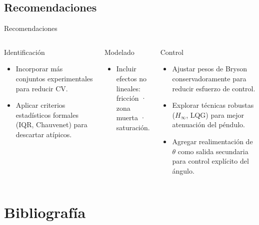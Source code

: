 \documentclass[mathserif,spanish,10pt]{beamer}
\begin{document}
\subsection{Recomendaciones}

\begin{frame}{Recomendaciones}
\begin{columns}[T]
  \begin{block}{Identificación}
    \begin{itemize}
      \item Incorporar más conjuntos experimentales para reducir CV.
      \item Aplicar criterios estadísticos formales (IQR, Chauvenet) para descartar atípicos.
    \end{itemize}
  \end{block}

  \begin{block}{Modelado}
    \begin{itemize}
      \item Incluir efectos no lineales:\\
            fricción · zona muerta · saturación.
    \end{itemize}
  \end{block}

  \begin{block}{Control}
    \begin{itemize}
      \item Ajustar pesos de Bryson conservadoramente para reducir esfuerzo de control.
      \item Explorar técnicas robustas ($H_\infty$, LQG) para mejor atenuación del péndulo.
      \item Agregar realimentación de $\theta$ como salida secundaria para control explícito del ángulo.
    \end{itemize}
  \end{block}
\end{columns}
\end{frame}

\section{Bibliografía}
\end{document}
